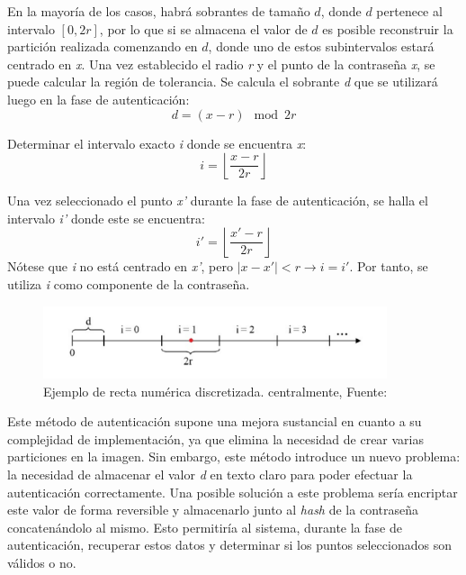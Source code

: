 En la mayoría de los casos, habrá sobrantes de tamaño \(d\), donde \(d\) pertenece al intervalo $[0, 2r]$, por lo que si se almacena el valor de \(d\) es posible reconstruir la partición realizada comenzando en \(d\), donde uno de estos subintervalos estará centrado en \textit{x}. Una vez establecido el radio \textit{r} y el punto de la contraseña \textit{x}, se puede calcular la región de tolerancia. Se calcula el sobrante \textit{d} que se utilizará luego en la fase de autenticación:
\begin{equation}
	d = (x - r) \mod{2r} \label{eq:sobrante}
\end{equation}

Determinar el intervalo exacto \textit{i} donde se encuentra \textit{x}:
\begin{equation}
	i = \left\lfloor \frac{x - r}{2r} \right\rfloor \label{eq:intervalo_registro}
\end{equation}

Una vez seleccionado el punto \textit{x'} durante la fase de autenticación, se halla el intervalo \textit{i'} donde este se encuentra:
\begin{equation}
	i' = \left\lfloor \frac{x' - r}{2r} \right\rfloor \label{eq:intervalo_autenticacion}
\end{equation}
Nótese que \textit{i} no está centrado en \textit{x'}, pero \(|x - x'| < r \rightarrow i = i'\). Por tanto, se utiliza \textit{i} como componente de la contraseña.

	\begin{figure}[H]
		\centering
		\includegraphics[width=0.9\textwidth]{image5.png}	
		\caption{Ejemplo de recta num\'erica discretizada. centralmente, Fuente: \cite{bicakci2008optimal}}	
	\end{figure}

Este método de autenticación supone una mejora sustancial en cuanto a su complejidad de implementación, ya que elimina la necesidad de crear varias particiones en la imagen. Sin embargo, este método introduce un nuevo problema: la necesidad de almacenar el valor \textit{d} en texto claro para poder efectuar la autenticación correctamente. Una posible solución a este problema sería encriptar este valor de forma reversible y almacenarlo junto al \textit{hash} de la contraseña concatenándolo al mismo. Esto permitiría al sistema, durante la fase de autenticación, recuperar estos datos y determinar si los puntos seleccionados son válidos o no.


